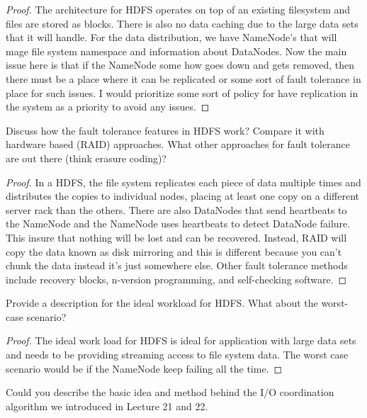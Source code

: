 \documentclass[12pt]{article}
\newenvironment{exercise}[2][Exercise]{\begin{trivlist}
\item[\hskip \labelsep {\bfseries #1}\hskip \labelsep {\bfseries #2.}]}{\end{trivlist}}
\begin{document}
\begin{proof}
The architecture for HDFS operates on top of an existing filesystem and files are stored as blocks. There is also no data caching due to the large data sets that it will handle. For the data distribution, we have NameNode's that will mage file system namespace and information about DataNodes. Now the main issue here is that if the NameNode some how goes down and gets removed, then there must be a place where it can be replicated or some sort of fault tolerance in place for such issues. I would prioritize some sort of policy for have replication in the system as a priority to avoid any issues.  
\end{proof}

\begin{exercise}{11}
Discuss how the fault tolerance features in HDFS work? Compare it with hardware based (RAID) approaches. What other approaches for fault tolerance are out there (think erasure coding)? 
\end{exercise}

\begin{proof}
In a HDFS, the file system replicates each piece of data multiple times and distributes the copies to individual nodes, placing at least one  copy on a different server rack than the others. There are also DataNodes that send heartbeats to the NameNode and the NameNode uses heartbeats to detect DataNode failure. This insure that nothing will be lost and can be recovered. Instead, RAID will copy the data known as disk mirroring and this is different because you can't chunk the data instead it's just somewhere else. Other fault tolerance methods include recovery blocks, n-version programming, and self-checking software. 
\end{proof}

\begin{exercise}{12}
Provide a description for the ideal workload for HDFS. What about the worst-case scenario?
\end{exercise}

\begin{proof}
The ideal work load for HDFS is ideal for application with large data sets and needs to be providing streaming access to file system data. The worst case scenario would be if the NameNode keep failing all the time. 
\end{proof}


\begin{exercise}{13}
Could you describe the basic idea and method behind the I/O coordination algorithm we introduced in Lecture 21 and 22. 
\end{exercise}
\end{document}
